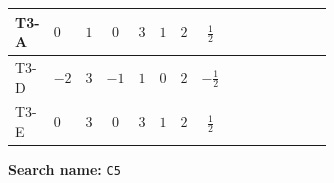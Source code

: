 \documentclass[8pt]{article}
\begin{document}
\begin{landscape}
\begin{longtable}{@{}llcccccc >{\raggedright\arraybackslash}p{0.21\linewidth} >{\raggedright\arraybackslash}p{0.21\linewidth} >{\raggedright\arraybackslash}p{0.21\linewidth}@{}}
\midrule
T3-A & $0$ & $1$ & $0$ & $3$ & $1$ & $2$ & $\frac{1}{2}$ & \scriptsize\adjustbox{max width=\linewidth}{$\begin{gathered} - 3 C_{5} g_{2}^{2}\end{gathered}$} & \scriptsize\adjustbox{max width=\linewidth}{$\begin{gathered} 2 C_{5} \lambda_H\end{gathered}$} & \scriptsize\adjustbox{max width=\linewidth}{$\begin{gathered} - C_{5} Y_e Y_e^\dagger\end{gathered}$} \\
\midrule
T3-D & $-2$ & $3$ & $-1$ & $1$ & $0$ & $2$ & $-\frac{1}{2}$ & \scriptsize\adjustbox{max width=\linewidth}{$\begin{gathered} - 3 C_{5} g_{2}^{2}\end{gathered}$} & \scriptsize\adjustbox{max width=\linewidth}{$\begin{gathered} 2 C_{5} \lambda_H\end{gathered}$} & \scriptsize\adjustbox{max width=\linewidth}{$\begin{gathered} - C_{5} Y_e Y_e^\dagger\end{gathered}$} \\
\midrule
T3-E & $0$ & $3$ & $0$ & $3$ & $1$ & $2$ & $\frac{1}{2}$ & \scriptsize\adjustbox{max width=\linewidth}{$\begin{gathered} - 3 C_{5} g_{2}^{2}\end{gathered}$} & \scriptsize\adjustbox{max width=\linewidth}{$\begin{gathered} 2 C_{5} \lambda_H\end{gathered}$} & \scriptsize\adjustbox{max width=\linewidth}{$\begin{gathered} - C_{5} Y_e Y_e^\dagger\end{gathered}$} \\
\midrule
\bottomrule
\end{longtable}
\clearpage
\noindent\textbf{Search name: }\texttt{C5}\par\smallskip

\end{landscape}
\end{document}
